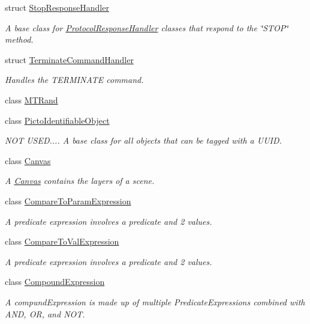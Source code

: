\begin{DoxyCompactItemize}
struct \hyperlink{struct_picto_1_1_stop_response_handler}{Stop\-Response\-Handler}
\begin{DoxyCompactList}\small\item\em A base class for \hyperlink{struct_picto_1_1_protocol_response_handler}{Protocol\-Response\-Handler} classes that respond to the \char`\"{}\-S\-T\-O\-P\char`\"{} method. \end{DoxyCompactList}\item 
struct \hyperlink{struct_picto_1_1_terminate_command_handler}{Terminate\-Command\-Handler}
\begin{DoxyCompactList}\small\item\em Handles the T\-E\-R\-M\-I\-N\-A\-T\-E command. \end{DoxyCompactList}\item 
class \hyperlink{class_picto_1_1_m_t_rand}{M\-T\-Rand}
\item 
class \hyperlink{class_picto_1_1_picto_identifiable_object}{Picto\-Identifiable\-Object}
\begin{DoxyCompactList}\small\item\em N\-O\-T U\-S\-E\-D.... A base class for all objects that can be tagged with a U\-U\-I\-D. \end{DoxyCompactList}\item 
class \hyperlink{class_picto_1_1_canvas}{Canvas}
\begin{DoxyCompactList}\small\item\em A \hyperlink{class_picto_1_1_canvas}{Canvas} contains the layers of a scene. \end{DoxyCompactList}\item 
class \hyperlink{class_picto_1_1_compare_to_param_expression}{Compare\-To\-Param\-Expression}
\begin{DoxyCompactList}\small\item\em A predicate expression involves a predicate and 2 values. \end{DoxyCompactList}\item 
class \hyperlink{class_picto_1_1_compare_to_val_expression}{Compare\-To\-Val\-Expression}
\begin{DoxyCompactList}\small\item\em A predicate expression involves a predicate and 2 values. \end{DoxyCompactList}\item 
class \hyperlink{class_picto_1_1_compound_expression}{Compound\-Expression}
\begin{DoxyCompactList}\small\item\em A compund\-Expression is made up of multiple Predicate\-Expressions combined with A\-N\-D, O\-R, and N\-O\-T. \end{DoxyCompactList}\item 

\end{DoxyCompactItemize}
